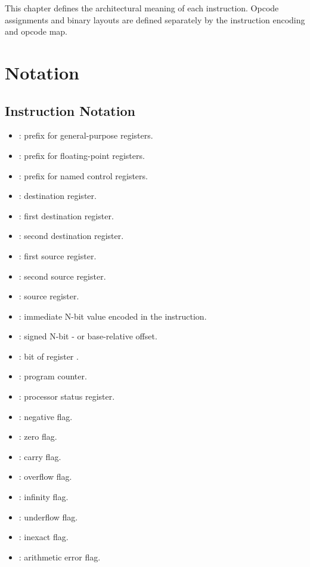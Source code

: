 This chapter defines the architectural meaning of each instruction. Opcode
assignments and binary layouts are defined separately by the instruction
encoding and opcode map.

\section{Notation}

\subsection{Instruction Notation}

\begin{itemize}
\item \code{\$}: prefix for general-purpose registers.
\item \code{\#}: prefix for floating-point registers.
\item \code{\%}: prefix for named control registers.
\item {}: destination register.
\item {}: first destination register.
\item {}: second destination register.
\item {}: first source register.
\item {}: second source register.
\item {}: source register.
\item {}: immediate N-bit value encoded in the instruction.
\item {}: signed N-bit - or base-relative offset.
\item {}: bit  of register .
\item {}: program counter.
\item {}: processor status register.
\item {}: negative flag.
\item {}: zero flag.
\item {}: carry flag.
\item {}: overflow flag.
\item {}: infinity flag.
\item {}: underflow flag.
\item {}: inexact flag.
\item {}: arithmetic error flag.
\end{itemize}

